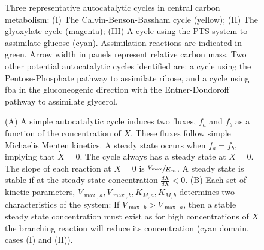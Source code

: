 \documentclass[final,10pt]{beamer}
\begin{document}
\begin{frame}{}
\begin{columns}[t]
    \begin{column}{0.48\textwidth}
        \begin{block}{}
            \begin{figure}
            \begin{adjustbox}{max totalsize={\textwidth}{\textheight},center}
                
            \end{adjustbox}
        \caption{
            \label{fig:realautocatal}
        Three representative autocatalytic cycles in central carbon metabolism: (I) The Calvin-Benson-Bassham cycle (yellow); (II) The glyoxylate cycle (magenta); (III) A cycle using the PTS system to assimilate glucose (cyan).
        Assimilation reactions are indicated in green.
        Arrow width in panels represent relative carbon mass.
        Two other potential autocatalytic cycles identified are: a cycle using the Pentose-Phosphate pathway to assimilate ribose, and a cycle using fba in the gluconeogenic direction with the Entner-Doudoroff pathway to assimilate glycerol.
}
\end{figure}
    \end{block}
         \begin{block}{}
             \begin{figure}
            \begin{adjustbox}{max totalsize={\textwidth}{\textheight},center}
                
            \end{adjustbox}
       \caption{\label{fig:simplecycle}
        (A) A simple autocatalytic cycle induces two fluxes, $f_a$ and $f_b$ as a function of the concentration of $X$.
        These fluxes follow simple Michaelis Menten kinetics.
        A steady state occurs when $f_a=f_b$, implying that $\dot{X}=0$.
        The cycle always has a steady state at $X=0$.
        The slope of each reaction at $X=0$ is $\sfrac{V_{\max}}{K_m}$.
        A steady state is stable if at the steady state concentration $\frac{d\dot{X}}{dX}<0$.
        (B) Each set of kinetic parameters, $V_{\max,a},V_{\max,b},K_{M,a},K_{M,b}$ determines two characteristics of the system: 
        If $V_{\max,b}>V_{\max,a}$, then a stable steady state concentration must exist as for high concentrations of $X$ the branching reaction will reduce its concentration (cyan domain, cases (I) and (II)).
}
\end{figure}
\end{block}
\end{column}
\end{columns}
\end{frame}
\end{document}
